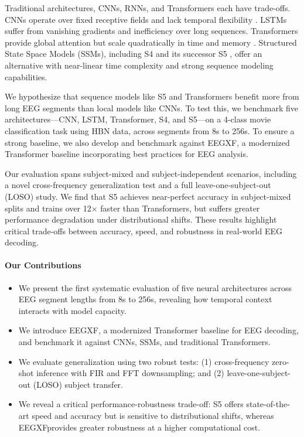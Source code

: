\documentclass{article}
\newcommand{\eegtrans}{EEGXF}
\begin{document}
Traditional architectures, CNNs, RNNs, and Transformers each have trade-offs. CNNs operate over fixed receptive fields and lack temporal flexibility \cite{roy2019deep}. LSTMs suffer from vanishing gradients and inefficiency over long sequences. Transformers provide global attention but scale quadratically in time and memory \cite{vaswani2017attention}. Structured State Space Models (SSMs), including S4 \cite{gu2022efficientlymodelinglongsequences} and its successor S5 \cite{gu2023mamba}, offer an alternative with near-linear time complexity and strong sequence modeling capabilities.

We hypothesize that sequence models like S5 and Transformers benefit more from long EEG segments than local models like CNNs. To test this, we benchmark five architectures—CNN, LSTM, Transformer, S4, and S5—on a 4-class movie classification task using HBN data, across segments from 8s to 256s. To ensure a strong baseline, we also develop and benchmark against \eegtrans, a modernized Transformer baseline incorporating best practices for EEG analysis.

Our evaluation spans subject-mixed and subject-independent scenarios, including a novel cross-frequency generalization test and a full leave-one-subject-out (LOSO) study. We find that S5 achieves near-perfect accuracy in subject-mixed splits and trains over 12× faster than Transformers, but suffers greater performance degradation under distributional shifts. These results highlight critical trade-offs between accuracy, speed, and robustness in real-world EEG decoding.

\paragraph*{Our Contributions}
\begin{itemize}
  \item We present the first systematic evaluation of five neural architectures across EEG segment lengths from 8s to 256s, revealing how temporal context interacts with model capacity.
  \item We introduce \eegtrans, a modernized Transformer baseline for EEG decoding, and benchmark it against CNNs, SSMs, and traditional Transformers.
  \item We evaluate generalization using two robust tests: (1) cross-frequency zero-shot inference with FIR and FFT downsampling; and (2) leave-one-subject-out (LOSO) subject transfer.
  \item We reveal a critical performance-robustness trade-off: S5 offers state-of-the-art speed and accuracy but is sensitive to distributional shifts, whereas \eegtrans provides greater robustness at a higher computational cost.
\end{itemize}
\end{document}
